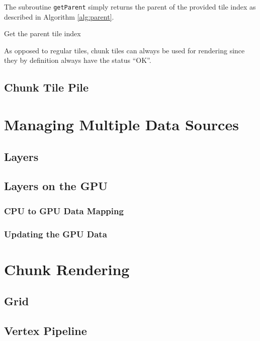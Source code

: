 The subroutine \texttt{getParent} simply returns the parent of the provided tile index as described in Algorithm \ref{alg:parent}.

\begin{algorithm}[htp]
 \caption{Get the parent tile index}
  \label{alg:parent}
\end{algorithm}

As opposed to regular tiles, chunk tiles can always be used for rendering since they by definition always have the status ``OK''.

\subsection{Chunk Tile Pile}



\section{Managing Multiple Data Sources}

\subsection{Layers}

\subsection{Layers on the GPU}

\subsubsection{CPU to GPU Data Mapping}

\subsubsection{Updating the GPU Data}


\section{Chunk Rendering}

\subsection{Grid}

\subsection{Vertex Pipeline}

